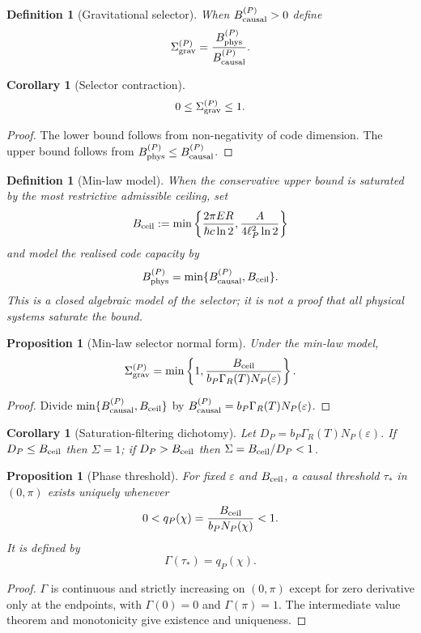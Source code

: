 \documentclass[11pt,a4paper]{article}
\newtheorem{proposition}[theorem]{Proposition}
\newtheorem{corollary}[theorem]{Corollary}
\newtheorem{definition}[theorem]{Definition}
\begin{document}
\begin{definition}[Gravitational selector]
When $B_{\rm causal}^{(P)}>0$ define
\[
\Sigma_{\rm grav}^{(P)}=
\frac{B_{\rm phys}^{(P)}}{B_{\rm causal}^{(P)}}.
\]
\end{definition}

\begin{corollary}[Selector contraction]
\[
0\le\Sigma_{\rm grav}^{(P)}\le1.
\]
\end{corollary}
\begin{proof}
The lower bound follows from non-negativity of code dimension.  The upper bound follows from $B_{\rm phys}^{(P)}\le B_{\rm causal}^{(P)}$.\end{proof}

\begin{definition}[Min-law model]
When the conservative upper bound is saturated by the most restrictive admissible ceiling, set
\[
B_{\rm ceil}:=\min\left\{\frac{2\pi ER}{\hbar c\ln2},\frac{A}{4\ell_P^2\ln2}\right\}
\]
and model the realised code capacity by
\[
B_{\rm phys}^{(P)}=\min\{B_{\rm causal}^{(P)},B_{\rm ceil}\}.
\]
This is a closed algebraic model of the selector; it is not a proof that all physical systems saturate the bound.
\end{definition}

\begin{proposition}[Min-law selector normal form]
Under the min-law model,
\[
\Sigma_{\rm grav}^{(P)}=
\min\left\{1,\frac{B_{\rm ceil}}{b_P\Gamma_R(T)N_P(\varepsilon)}\right\}.
\]
\end{proposition}
\begin{proof}
Divide $\min\{B_{\rm causal}^{(P)},B_{\rm ceil}\}$ by $B_{\rm causal}^{(P)}=b_P\Gamma_R(T)N_P(\varepsilon)$.\end{proof}

\begin{corollary}[Saturation-filtering dichotomy]
Let $D_P=b_P\Gamma_R(T)N_P(\varepsilon)$.  If $D_P\le B_{\rm ceil}$ then $\Sigma=1$; if $D_P>B_{\rm ceil}$ then $\Sigma=B_{\rm ceil}/D_P<1$.
\end{corollary}

\begin{proposition}[Phase threshold]
For fixed $\varepsilon$ and $B_{\rm ceil}$, a causal threshold $\tau_*$ in $(0,\pi)$ exists uniquely whenever
\[
0<q_P(\chi)=\frac{B_{\rm ceil}}{b_PN_P(\chi)}<1.
\]
It is defined by
\[
\Gamma(\tau_*)=q_P(\chi).
\]
\end{proposition}
\begin{proof}
$\Gamma$ is continuous and strictly increasing on $(0,\pi)$ except for zero derivative only at the endpoints, with $\Gamma(0)=0$ and $\Gamma(\pi)=1$.  The intermediate value theorem and monotonicity give existence and uniqueness.\end{proof}
\end{document}
